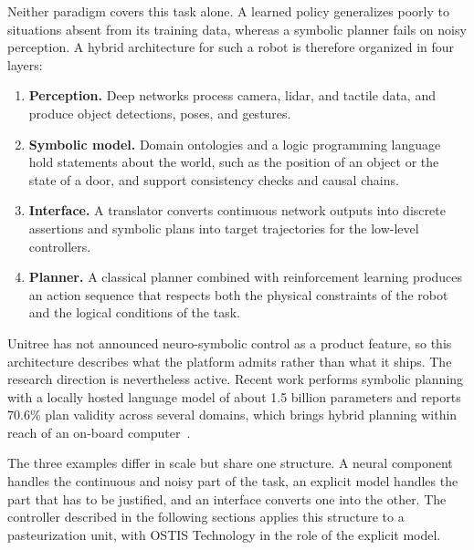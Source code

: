 Neither paradigm covers this task alone. A learned policy generalizes poorly to
situations absent from its training data, whereas a symbolic planner fails on
noisy perception. A hybrid architecture for such a robot is therefore organized
in four layers:

\begin{enumerate}
    \item \textbf{Perception.} Deep networks process camera, lidar, and tactile
    data, and produce object detections, poses, and gestures.
    \item \textbf{Symbolic model.} Domain ontologies and a logic programming
    language hold statements about the world, such as the position of an object
    or the state of a door, and support consistency checks and causal chains.
    \item \textbf{Interface.} A translator converts continuous network outputs
    into discrete assertions and symbolic plans into target trajectories for the
    low-level controllers.
    \item \textbf{Planner.} A classical planner combined with reinforcement
    learning produces an action sequence that respects both the physical
    constraints of the robot and the logical conditions of the task.
\end{enumerate}

Unitree has not announced neuro-symbolic control as a product feature, so this
architecture describes what the platform admits rather than what it ships. The
research direction is nevertheless active. Recent work performs symbolic
planning with a locally hosted language model of about 1.5 billion parameters
and reports 70.6\% plan validity across several domains, which brings hybrid
planning within reach of an on-board computer~\cite{Attolino2025}.

The three examples differ in scale but share one structure. A neural component
handles the continuous and noisy part of the task, an explicit model handles the
part that has to be justified, and an interface converts one into the other. The
controller described in the following sections applies this structure to a
pasteurization unit, with OSTIS Technology in the role of the explicit model.

